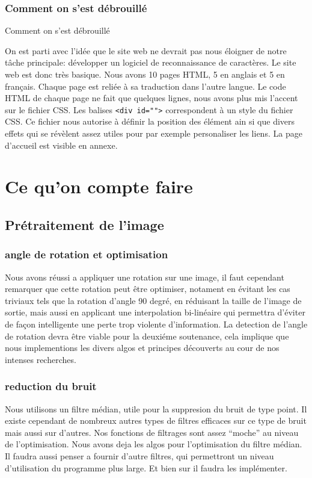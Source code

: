 \documentclass[]{report}
\begin{document}
		\section{Comment on s'est d\'ebrouill\'e} %
		\label{sec:comment_on_s_est_d'ebrouill'e}
		Comment on s'est débrouillé

			On est parti avec l'idée que le site web ne devrait pas nous éloigner de notre tâche principale: développer un logiciel de reconnaissance de caractères. Le site web est donc tr\`es basique. Nous avons 10 pages HTML, 5 en anglais et 5 en fran\c cais. Chaque page est reli\'ee \`a sa traduction dans l'autre langue.
			Le code HTML de chaque page ne fait que quelques lignes, nous avons plus mis l'accent sur le fichier CSS. Les balises \verb!<div id="">! correspondent \`a un style du fichier CSS. Ce fichier nous autorise \`a d\'efinir la position des \'el\'ement ain si que divers effets qui se r\'ev\`elent assez utiles pour par exemple personaliser les liens.
			La page d'accueil est visible en annexe.
			 




\part{Ce qu'on compte faire} %
\label{prt:ce_qu_on_compte_faire}

\chapter{Pr\'etraitement de l'image} %
        \section{angle de rotation et optimisation}
        Nous avons r\'eussi a appliquer une rotation sur une image, il faut cependant remarquer que cette rotation peut \^etre optimiser, notament en \'evitant les cas triviaux tels que la rotation d'angle 90 degr\'e, en r\'eduisant la taille de l'image de sortie, mais aussi en applicant une interpolation bi-lin\'eaire qui permettra d'\'eviter de fa\c con intelligente une perte trop violente d'information.
        La detection de l'angle de rotation devra \^etre viable pour la deuxi\'eme soutenance, cela implique que nous implementions les divers algos et principes d\'ecouverts au cour de nos intenses recherches.
        \section{reduction du bruit}
        Nous utilisons un filtre m\'edian, utile pour la suppresion du bruit de type point. Il existe cependant de nombreux autres types de filtres efficaces sur ce type de bruit mais aussi sur d'autres. Nos fonctions de filtrages sont assez ``moche'' au niveau de l'optimisation. Nous avons deja les algos pour l'optimisation du filtre m\'edian. Il faudra aussi penser a fournir d'autre filtres, qui permettront un niveau d'utilisation du programme plus large. Et bien sur il faudra les impl\'ementer.
\end{document}
